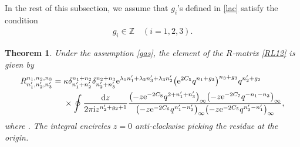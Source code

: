 \documentclass[pdftex]{sigma}
\newcommand{\Z}{{\mathbb Z}}
\newcommand{\e}{{\mathrm e}}
\numberwithin{equation}{section}
\newtheorem{Theorem}{Theorem}[section]
\begin{document}
In the rest of this subsection, we assume that $g_i$'s defined in \eqref{lac} satisfy the condition
\begin{align}\label{gas}
g_i \in \Z\quad (i=1,2,3).
\end{align}

\begin{Theorem}\label{th:re}
Under the assumption \eqref{gas},
the element  of the $R$-matrix \eqref{RL12} is given by
\begin{align}
R^{n_1, n_2, n_3}_{n'_1, n'_2, n'_3}
={}& \kappa \delta^{n_1+n_2}_{n'_1+n'_2} \delta^{n_2+n_3}_{n'_2+n'_3}
\e^{\lambda_1 n'_1+\lambda_2n'_3+\lambda_3 n'_2}
\bigl(\e^{2C_5}q^{n_1+g_3}\bigr)^{n_3+g_3}q^{n'_2+g_2}\nonumber
\\
& \times
\oint\frac{{\rm d}z}{2\pi {\rm i} z^{n'_2+g_2+1}}
\frac{\bigl(-z\e^{-2C_8}q^{2+n'_1+n'_3}\bigr)_\infty\bigl(-z\e^{-2C_7}q^{-n_1-n_3}\bigr)_\infty}
{\bigl(-z\e^{-2C_6}q^{n'_1-n'_3}\bigr)_\infty\bigl(-z\e^{-2C_5}q^{n'_3-n'_1}\bigr)_\infty},\label{Rf1}
\end{align}
where
\smash{$\kappa = \e^{\tfrac{1}{2}(\tfrac{ {\rm i} \pi}{\hbar}+1)(\lambda_1+\lambda_2+\lambda_3)}$}.
The integral encircles $z=0$ anti-clockwise picking the residue at the origin.
\end{Theorem}
\end{document}
